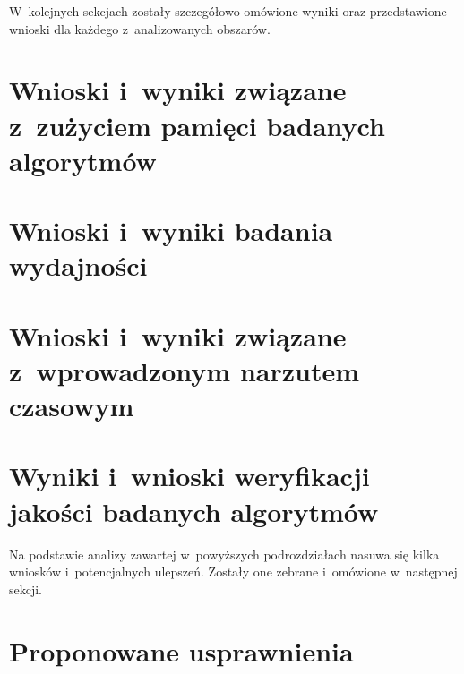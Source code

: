   W~kolejnych sekcjach zostały szczegółowo omówione wyniki oraz przedstawione wnioski dla każdego z~analizowanych obszarów.

  \section{Wnioski i~wyniki związane z~zużyciem pamięci badanych algorytmów}\label{Section_Memory}

  \section{Wnioski i~wyniki badania wydajności}\label{Section_Timing}

  \section{Wnioski i~wyniki związane z~wprowadzonym narzutem czasowym}\label{Section_Overhead}

  \section{Wyniki i~wnioski weryfikacji jakości badanych algorytmów}\label{Section_Quality}

  Na podstawie analizy zawartej w~powyższych podrozdziałach nasuwa się kilka wniosków i~potencjalnych ulepszeń. Zostały one zebrane i~omówione w~następnej sekcji.

  \section{Proponowane usprawnienia}\label{Section_Usprawnienia}

